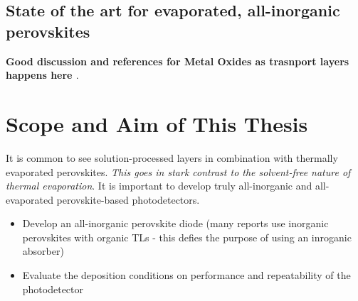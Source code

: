 \subsection{State of the art for evaporated, all-inorganic perovskites}

\textbf{Good discussion and references for Metal Oxides as trasnport layers happens here \cite{Yang2023InvertedPassivation}}.


\section{Scope and Aim of This Thesis}

It is common to see solution-processed layers in combination with thermally evaporated perovskites. \textit{This goes in stark contrast to the solvent-free nature of thermal evaporation}. It is important to develop truly all-inorganic and all-evaporated perovskite-based photodetectors. 



\begin{itemize}
    \item Develop an all-inorganic perovskite diode (many reports use inorganic perovskites with organic TLs - this defies the purpose of using an inroganic absorber)
    \item Evaluate the deposition conditions on performance and repeatability of the photodetector
\end{itemize}


\cleardoublepage

